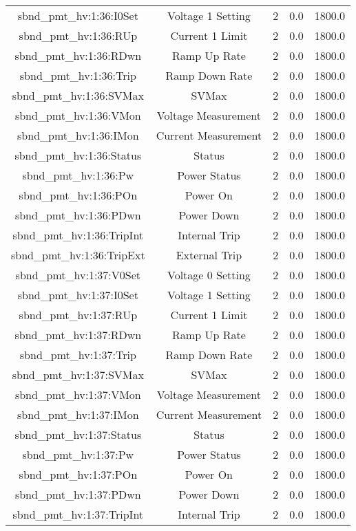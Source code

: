 \begin{center}
\begin{longtable}{c | c c c c }
sbnd\_pmt\_hv:1:36:I0Set & Voltage 1 Setting & 2 & 0.0 & 1800.0\\ 
sbnd\_pmt\_hv:1:36:RUp & Current 1 Limit & 2 & 0.0 & 1800.0\\ 
sbnd\_pmt\_hv:1:36:RDwn & Ramp Up Rate & 2 & 0.0 & 1800.0\\ 
sbnd\_pmt\_hv:1:36:Trip & Ramp Down Rate & 2 & 0.0 & 1800.0\\ 
sbnd\_pmt\_hv:1:36:SVMax & SVMax & 2 & 0.0 & 1800.0\\ 
sbnd\_pmt\_hv:1:36:VMon & Voltage Measurement & 2 & 0.0 & 1800.0\\ 
sbnd\_pmt\_hv:1:36:IMon & Current Measurement & 2 & 0.0 & 1800.0\\ 
sbnd\_pmt\_hv:1:36:Status & Status & 2 & 0.0 & 1800.0\\ 
sbnd\_pmt\_hv:1:36:Pw & Power Status & 2 & 0.0 & 1800.0\\ 
sbnd\_pmt\_hv:1:36:POn & Power On & 2 & 0.0 & 1800.0\\ 
sbnd\_pmt\_hv:1:36:PDwn & Power Down & 2 & 0.0 & 1800.0\\ 
sbnd\_pmt\_hv:1:36:TripInt & Internal Trip & 2 & 0.0 & 1800.0\\ 
sbnd\_pmt\_hv:1:36:TripExt & External Trip & 2 & 0.0 & 1800.0\\ 
sbnd\_pmt\_hv:1:37:V0Set & Voltage 0 Setting & 2 & 0.0 & 1800.0\\ 
sbnd\_pmt\_hv:1:37:I0Set & Voltage 1 Setting & 2 & 0.0 & 1800.0\\ 
sbnd\_pmt\_hv:1:37:RUp & Current 1 Limit & 2 & 0.0 & 1800.0\\ 
sbnd\_pmt\_hv:1:37:RDwn & Ramp Up Rate & 2 & 0.0 & 1800.0\\ 
sbnd\_pmt\_hv:1:37:Trip & Ramp Down Rate & 2 & 0.0 & 1800.0\\ 
sbnd\_pmt\_hv:1:37:SVMax & SVMax & 2 & 0.0 & 1800.0\\ 
sbnd\_pmt\_hv:1:37:VMon & Voltage Measurement & 2 & 0.0 & 1800.0\\ 
sbnd\_pmt\_hv:1:37:IMon & Current Measurement & 2 & 0.0 & 1800.0\\ 
sbnd\_pmt\_hv:1:37:Status & Status & 2 & 0.0 & 1800.0\\ 
sbnd\_pmt\_hv:1:37:Pw & Power Status & 2 & 0.0 & 1800.0\\ 
sbnd\_pmt\_hv:1:37:POn & Power On & 2 & 0.0 & 1800.0\\ 
sbnd\_pmt\_hv:1:37:PDwn & Power Down & 2 & 0.0 & 1800.0\\ 
sbnd\_pmt\_hv:1:37:TripInt & Internal Trip & 2 & 0.0 & 1800.0\\ 

\end{longtable}
\end{center}
